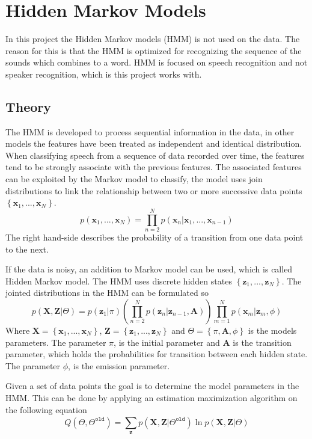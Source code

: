 \chapter{Hidden Markov Models}
In this project the Hidden Markov models (HMM) is not used on the data.
The reason for this is that the HMM is optimized for recognizing the sequence of the sounds which combines to a word.
HMM is focused on speech recognition and not speaker recognition, which is this project works with.

\section{Theory}   
The HMM is developed to process sequential information in the data, in other models the features have been treated as independent and identical distribution.
When classifying speech from a sequence of data recorded over time, the features tend to be strongly associate with the previous features.
The associated features can be exploited by the Markov model to classify, the model uses join distributions to link the relationship between two or more successive data points $ \left\lbrace \mathbf{x}_1,...,\mathbf{x}_N \right\rbrace  $.
\begin{equation}
p(\mathbf{x}_1,...,\mathbf{x}_N) = 
\prod_{n=2}^{N} 
p(\mathbf{x}_n | \mathbf{x}_1,...,\mathbf{x}_{n-1})
\label{eq:HMM_JD}
\end{equation} 
The right hand-side describes the probability of a transition from one data point to the next.

If the data is noisy, an addition to Markov model can be used, which is called Hidden Markov model.
The HMM uses discrete hidden states $ \left\lbrace \mathbf{z}_1,..., \mathbf{z}_N \right\rbrace  $.
The jointed distributions in the HMM can be formulated so
\begin{equation}
p(\mathbf{X},\mathbf{Z}|\Theta) = 
p(\mathbf{z}_1|\pi)
\left(\prod_{n=2}^{N} p(\mathbf{z}_n|\mathbf{z}_{n-1},\mathbf{A}) \right)
\prod_{m=1}^{N} p(\mathbf{x}_m|\mathbf{z}_m,\phi) 
\label{eq:HMM}
\end{equation}
Where $ \mathbf{X} = \left\lbrace \mathbf{x}_1,...,\mathbf{x}_N \right\rbrace  $, $ \mathbf{Z} = \left\lbrace \mathbf{z}_1,...,\mathbf{z}_N \right\rbrace  $ and $ \Theta = \left\lbrace \pi, \mathbf{A}, \phi \right\rbrace  $ is the models parameters. The parameter $ \pi $, is the initial parameter and \textbf{A} is the transition parameter, which holds the probabilities for transition between each hidden state.
The parameter $ \phi $, is the emission parameter. 

Given a set of data points the goal is to determine the model parameters in the HMM. This can be done by applying an estimation maximization algorithm on the following equation
\begin{equation}
Q(\Theta,\Theta^{\mathtt{old}})=
\sum_{\mathbf{z}}^{} p(\mathbf{X},\mathbf{Z}|\Theta^{\mathtt{old}})
\ln p(\mathbf{X},\mathbf{Z}|\Theta)
\end{equation}
             